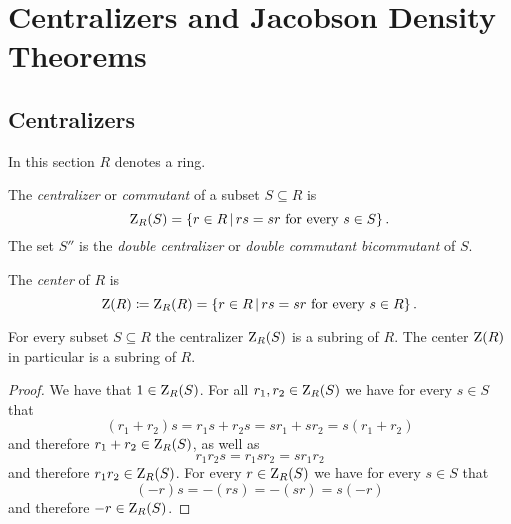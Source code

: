 \section{Centralizers and Jacobson Density Theorems}





\subsection{Centralizers}
\label{subsection: centralizers}


\begin{conventions}
  In this section $R$ denotes a ring.
\end{conventions}


\begin{definition}
  The \emph{centralizer} or \emph{commutant} of a subset $S \subseteq R$ is
  \[
      \centralizer_R(S)
    = \{
        r \in R
      \suchthat
        \text{$rs = sr$ for every $s \in S$}
      \} \,.
  \]
  The set $S''$ is the \emph{double centralizer} or \emph{double commutant} \emph{bicommutant} of $S$.
\end{definition}


\begin{definition}
  The \emph{center} of $R$ is
  \[
              \ringcenter(R)
    \defined  \centralizer_R(R)
    =         \{
                r \in R
              \suchthat
                \text{$rs = sr$ for every $s \in R$}
              \} \,.
  \]
\end{definition}


\begin{lemma}
  For every subset $S \subseteq R$ the centralizer $\operatorname{Z}_R(S)$ is a subring of $R$.
  The center $\operatorname{Z}(R)$ in particular is a subring of $R$.
\end{lemma}


\begin{proof}
  We have that $1 \in \operatorname{Z}_R(S)$.
  For all $r_1, r_2 \in \operatorname{Z}_R(S)$ we have for every $s \in S$ that
  \[
      (r_1 + r_2)s
    = r_1 s + r_2 s
    = s r_1 + s r_2
    = s (r_1 + r_2)
  \]
  and therefore $r_1 + r_2 \in \operatorname{Z}_R(S)$, as well as
  \[
      r_1 r_2 s
    = r_1 s r_2
    = s r_1 r_2
  \]
  and therefore $r_1 r_2 \in \operatorname{Z}_R(S)$.
  For every $r \in \operatorname{Z}_R(S)$ we have for every $s \in S$ that
  \[
      (-r) s
    = - (rs)
    = - (sr)
    = s (-r)
  \]
  and therefore $-r \in \operatorname{Z}_R(S)$.
\end{proof}


